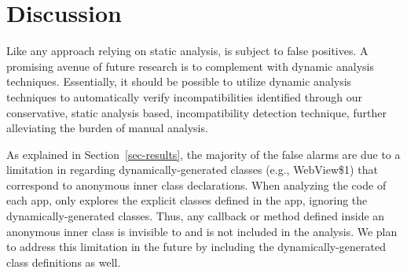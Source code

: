 \section{Discussion}\label{sec-discussion}

Like any approach relying on static analysis, \@approach is subject
to false positives. A promising avenue of future research is
to complement \@approach with dynamic analysis techniques.
Essentially, it should be possible to utilize dynamic
analysis techniques to automatically verify
incompatibilities identified through our conservative,
static analysis based, incompatibility detection technique,
further alleviating the burden of manual analysis.

As explained in Section~\ref{sec-results}, the majority of the
false alarms are due to a limitation in \@approach regarding
dynamically-generated classes (e.g., {\sf WebView\$1}) that
correspond to anonymous inner class declarations.  When
analyzing the code of each app, \@approach only explores the
explicit classes defined in the app, ignoring the
dynamically-generated classes. Thus, any callback or method
defined inside an anonymous inner class is invisible to
\@approach and is not included in the analysis. We plan to
address this limitation in the future by including the
dynamically-generated class definitions as well.


